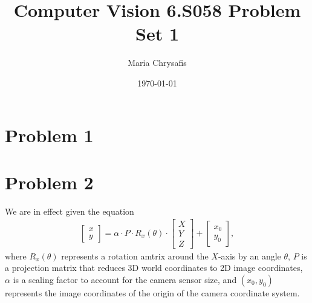 \documentclass[a4paper]{article}
\author{Maria Chrysafis}
\date{\today}
\title{Computer Vision 6.S058 Problem Set 1}
\begin{document}
\maketitle
\section{Problem 1}
\section{Problem 2}
We are in effect given the equation
\begin{align*}
\begin{bmatrix}
    x \\ y
\end{bmatrix}
= \alpha \cdot P \cdot R_x (\theta) \cdot \begin{bmatrix}
    X \\ Y \\ Z
\end{bmatrix}
+ \begin{bmatrix}
    x_0 \\ y_0
\end{bmatrix},
\end{align*}
where $R_x(\theta)$ represents a rotation amtrix around the $X$-axis by an angle $\theta$, $P$ is a projection matrix that reduces 3D world coordinates to 2D image coordinates, $\alpha$ is a scaling factor to account for the camera sensor size, and $(x_0, y_0)$ represents the image coordinates of the origin of the camera coordinate system.
\end{document}
